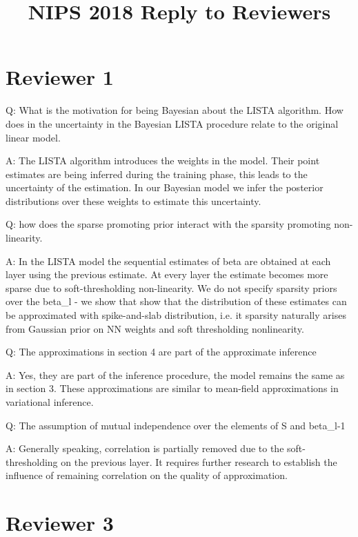 \documentclass{article}
\begin{document}
\title{NIPS 2018 Reply to Reviewers}
\date{}
\maketitle

\section*{Reviewer 1}
Q: What is the motivation for being Bayesian about the LISTA algorithm. How does in the uncertainty in the Bayesian LISTA procedure relate to the original linear model.

A: The LISTA algorithm introduces the weights in the model. Their point estimates are being inferred during the training phase, this leads to the uncertainty of the estimation. In our Bayesian model we infer the posterior distributions over these weights to estimate this uncertainty.
\newline
\newline

Q: how does the sparse promoting prior interact with the sparsity promoting non-linearity.

A: In the LISTA model the sequential estimates of beta are obtained at each layer using the previous estimate. At every layer the estimate becomes more sparse due to soft-thresholding non-linearity. We do not specify sparsity priors over the beta_l - we show that show that the distribution of these estimates can be approximated with spike-and-slab distribution, i.e. it sparsity naturally arises from Gaussian prior on NN weights and soft thresholding nonlinearity.
\newline
\newline

Q: The approximations in section 4 are part of the approximate inference

A: Yes, they are part of the inference procedure, the model remains the same as in section 3. These approximations are similar to mean-field approximations in variational inference.
\newline
\newline

Q: The assumption of mutual independence over the elements of S and beta_{l-1}

A: Generally speaking, correlation is partially removed due to the soft-thresholding on the previous layer. It requires further research to establish the influence of remaining correlation on the quality of approximation.
\newline
\newline

\section*{Reviewer 3}
\end{document}
